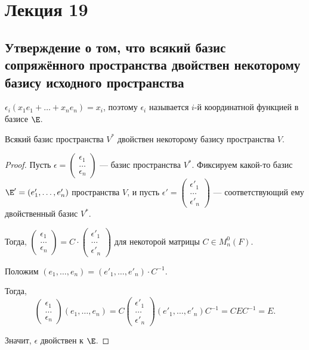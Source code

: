 \section{Лекция 19}


\subsection{Утверждение о том, что всякий базис сопряжённого пространства двойствен некоторому базису исходного пространства}

$\epsilon_i (x_1 e_1 + \dots + x_n e_n) = x_i$, поэтому $\epsilon_i$ называется $i$-й координатной функцией в базисе $\E$.

\begin{proposal}
    Всякий базис пространства $V^*$ двойствен некоторому базису пространства $V$. 
\end{proposal}

\begin{proof}
    Пусть $\epsilon = \begin{pmatrix} \epsilon_1 \\ \dots \\ \epsilon_n \end{pmatrix}$ --- базис пространства $V^*$.
    Фиксируем какой-то базис $\E' = (e'_1, \dots, e'_n)$ пространства $V$, и пусть $\epsilon' = \begin{pmatrix} \epsilon'_1 \\ \dots \\ \epsilon'_n \end{pmatrix}$ --- соответствующий ему двойственный базис $V^*$.

    Тогда, 
    $\begin{pmatrix} \epsilon_1 \\ \dots \\ \epsilon_n \end{pmatrix} = C \cdot \begin{pmatrix} \epsilon'_1 \\ \dots \\ \epsilon'_n \end{pmatrix}$
    для некоторой матрицы $C \in M^0_n(F)$.

    \bigskip
    Положим $(e_1, \dots, e_n) = (e'_1, \dots, e'_n) \cdot C^{-1}$.

    Тогда, 
    \begin{equation*}
        \begin{pmatrix} \epsilon_1 \\ \dots \\ \epsilon_n \end{pmatrix} (e_1, \dots, e_n) = C \begin{pmatrix} \epsilon'_1 \\ \dots \\ \epsilon'_n \end{pmatrix} (e'_1, \dots, e'_n) C^{-1} = C E C^{-1} = E
    .\end{equation*}

    Значит, $\epsilon$ двойствен к $\E$.
\end{proof}

